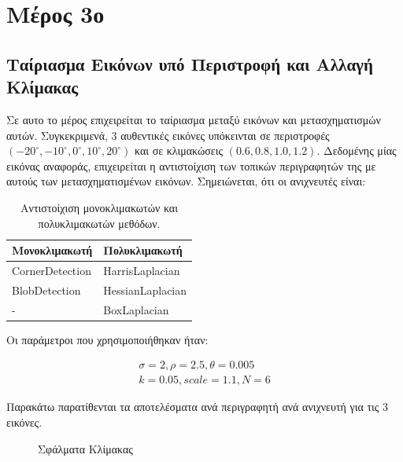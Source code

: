 \documentclass{article}
\newcommand{\eng}[1]{\foreignlanguage{english}{#1}}
\begin{document}
\section{Μέρος 3ο}

\subsection{Ταίριασμα Εικόνων υπό Περιστροφή και Αλλαγή Κλίμακας}

Σε αυτο το μέρος επιχειρείται το ταίριασμα μεταξύ εικόνων και μετασχηματισμών αυτών. Συγκεκριμενά, 3 αυθεντικές εικόνες υπόκεινται σε περιστροφές $(-20^{\circ}, -10^{\circ}, 0^{\circ}, 10^{\circ}, 20^{\circ})$ και σε κλιμακώσεις  $(0.6, 0.8, 1.0, 1.2)$. Δεδομένης μίας εικόνας αναφοράς, επιχειρείται η αντιστοίχιση των τοπικών περιγραφητών της με αυτούς των μετασχηματισμένων εικόνων. Σημειώνεται, ότι οι ανιχνευτές είναι:

\begin{table}[htbp]
  \centering
  \caption{Αντιστοίχιση μονοκλιμακωτών και πολυκλιμακωτών μεθόδων.}
    \begin{tabular}{l|l}
    \toprule
    Μονοκλιμακωτή & Πολυκλιμακωτή \\
    \midrule
    \eng{CornerDetection} & \eng{HarrisLaplacian} \\
    \eng{BlobDetection}   & \eng{HessianLaplacian} \\
    -   &  \eng{BoxLaplacian} \\
    \bottomrule
    \end{tabular}%
  \label{tab:mytable}%
\end{table}%

Οι παράμετροι που χρησιμοποιήθηκαν ήταν:

\begin{equation}
    \begin{gathered}
        \sigma = 2, \rho = 2.5, \theta = 0.005\\
        k = 0.05, scale = 1.1, N = 6
    \end{gathered}
\end{equation}

Παρακάτω παρατίθενται τα αποτελέσματα ανά περιγραφητή ανά ανιχνευτή για τις 3 εικόνες.

\begin{figure}[h]
    
    \caption{Σφάλματα Κλίμακας}
\end{figure}
\FloatBarrier
\end{document}
